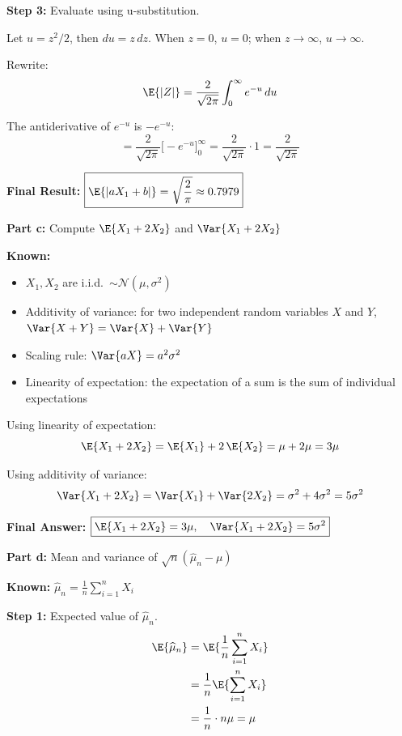 \documentclass{article}
\begin{document}
\begin{aprob}
    \medskip
    \textbf{Step 3:} Evaluate using u-substitution.

    Let $u = z^2/2$, then $du = z\,dz$. When $z=0$, $u=0$; when $z \to \infty$, $u \to \infty$.

    Rewrite:
    \[
        \E{|Z|} = \frac{2}{\sqrt{2\pi}} \int_{0}^{\infty} e^{-u}\, du
    \]

    The antiderivative of $e^{-u}$ is $-e^{-u}$:
    \[
        = \frac{2}{\sqrt{2\pi}} \Big[-e^{-u}\Big]_0^{\infty} = \frac{2}{\sqrt{2\pi}} \cdot 1 = \frac{2}{\sqrt{2\pi}}
    \]

    \medskip
    \textbf{Final Result:} $\boxed{\E{|aX_1 + b|} = \sqrt{\dfrac{2}{\pi}} \approx 0.7979}$

    \bigskip
    \begin{mdframed}
    \textbf{\large Part c:} Compute $\E{X_1 + 2X_2}$ and $\Var{X_1 + 2X_2}$
    \end{mdframed}

    \textbf{Known:}
    \begin{itemize}
        \item $X_1, X_2$ are i.i.d.\ $\sim \mathcal{N}(\mu, \sigma^2)$
        \item Additivity of variance: for two independent random variables $X$ and $Y$, $\Var{X + Y} = \Var{X} + \Var{Y}$
        \item Scaling rule: $\Var{aX} = a^2\sigma^2$
        \item Linearity of expectation: the expectation of a sum is the sum of individual expectations
    \end{itemize}

    \medskip
    Using linearity of expectation:
    \[
        \E{X_1 + 2X_2} = \E{X_1} + 2\,\E{X_2} = \mu + 2\mu = 3\mu
    \]

    Using additivity of variance:
    \[
        \Var{X_1 + 2X_2} = \Var{X_1} + \Var{2X_2} = \sigma^2 + 4\sigma^2 = 5\sigma^2
    \]

    \medskip
    \textbf{Final Answer:} $\boxed{\E{X_1 + 2X_2} = 3\mu, \quad \Var{X_1 + 2X_2} = 5\sigma^2}$

    \bigskip
    \begin{mdframed}
    \textbf{\large Part d:} Mean and variance of $\sqrt{n}(\widehat{\mu}_n - \mu)$
    \end{mdframed}

    \textbf{Known:} $\widehat{\mu}_n = \frac{1}{n} \sum_{i=1}^{n} X_i$

    \medskip
    \textbf{Step 1:} Expected value of $\widehat{\mu}_n$.
    \begin{align*}
        \E{\widehat{\mu}_n} &= \E{\frac{1}{n} \sum_{i=1}^n X_i} \\
        &= \frac{1}{n} \E{\sum_{i=1}^n X_i} \\
        &= \frac{1}{n} \cdot n\mu = \mu
    \end{align*}


\end{aprob}
\end{document}
